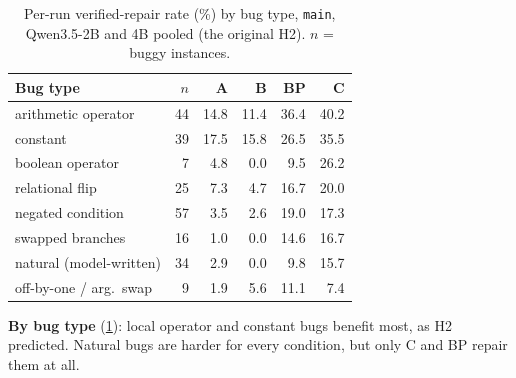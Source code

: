 \documentclass[10pt,twocolumn]{article}
\begin{document}
\begin{table}[!h]\centering\small
\caption{Per-run verified-repair rate (\%) by bug type, \texttt{main}, Qwen3.5-2B and 4B pooled (the original
H2). $n$ = buggy instances.}\label{tab:bugtype}
\setlength{\tabcolsep}{4pt}
\begin{tabular}{@{}lrrrrr@{}}\toprule
Bug type & $n$ & A & B & BP & C \\\midrule
arithmetic operator & 44 & 14.8 & 11.4 & 36.4 & 40.2 \\
constant & 39 & 17.5 & 15.8 & 26.5 & 35.5 \\
boolean operator & 7 & 4.8 & 0.0 & 9.5 & 26.2 \\
relational flip & 25 & 7.3 & 4.7 & 16.7 & 20.0 \\
negated condition & 57 & 3.5 & 2.6 & 19.0 & 17.3 \\
swapped branches & 16 & 1.0 & 0.0 & 14.6 & 16.7 \\
natural (model-written) & 34 & 2.9 & 0.0 & 9.8 & 15.7 \\
off-by-one / arg.\ swap & 9 & 1.9 & 5.6 & 11.1 & 7.4 \\\bottomrule
\end{tabular}
\end{table}

\textbf{By bug type} (\cref{tab:bugtype}): local operator and constant bugs benefit most, as H2 predicted.
Natural bugs are harder for every condition, but only C and BP repair them at all.
\end{document}
